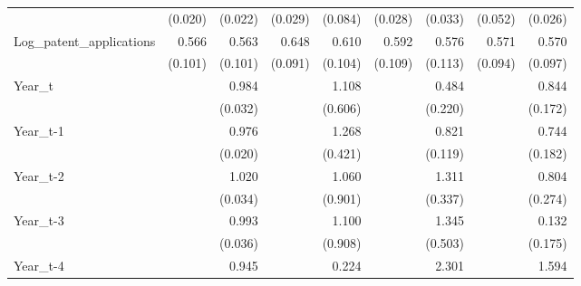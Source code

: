\begin{table}[htbp]
\begin{tabular}{l*{8}{D{.}{.}{-1}}}
            &     (0.020)         &     (0.022)         &     (0.029)         &     (0.084)         &     (0.028)         &     (0.033)         &     (0.052)         &     (0.026)         \\
Log\_patent\_applications&       0.566\sym{***}&       0.563\sym{***}&       0.648\sym{***}&       0.610\sym{***}&       0.592\sym{***}&       0.576\sym{***}&       0.571\sym{***}&       0.570\sym{***}\\
            &     (0.101)         &     (0.101)         &     (0.091)         &     (0.104)         &     (0.109)         &     (0.113)         &     (0.094)         &     (0.097)         \\
Year\_t      &                     &       0.984         &                     &       1.108         &                     &       0.484         &                     &       0.844         \\
            &                     &     (0.032)         &                     &     (0.606)         &                     &     (0.220)         &                     &     (0.172)         \\
Year\_t-1    &                     &       0.976         &                     &       1.268         &                     &       0.821         &                     &       0.744         \\
            &                     &     (0.020)         &                     &     (0.421)         &                     &     (0.119)         &                     &     (0.182)         \\
Year\_t-2    &                     &       1.020         &                     &       1.060         &                     &       1.311         &                     &       0.804         \\
            &                     &     (0.034)         &                     &     (0.901)         &                     &     (0.337)         &                     &     (0.274)         \\
Year\_t-3    &                     &       0.993         &                     &       1.100         &                     &       1.345         &                     &       0.132         \\
            &                     &     (0.036)         &                     &     (0.908)         &                     &     (0.503)         &                     &     (0.175)         \\
Year\_t-4    &                     &       0.945         &                     &       0.224         &                     &       2.301         &                     &       1.594         \\

\end{tabular}
\end{table}
